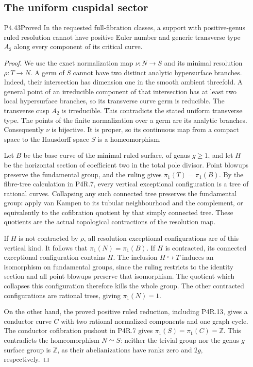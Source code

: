 \subsection{The uniform cuspidal sector}

\begin{statement}{P4.43}{Proved}
In the requested full-fibration classes, a support with
positive-genus ruled resolution cannot have positive
Euler number and generic transverse type $A_2$ along
every component of its critical curve.
\end{statement}
\begin{proof}
We use the exact normalization map
$\nu:N\longrightarrow S$ and its minimal resolution
$\rho:T\longrightarrow N$. A germ of $S$ cannot have
two distinct analytic hypersurface branches. Indeed,
their intersection has dimension one in the smooth
ambient threefold. A general point of an irreducible
component of that intersection has at least two local
hypersurface branches, so its transverse curve germ is
reducible. The transverse cusp $A_2$ is irreducible.
This contradicts the stated uniform transverse type.
The points of the finite normalization over a germ are
its analytic branches. Consequently $\nu$ is bijective.
It is proper, so its continuous map from a compact space
to the Hausdorff space $S$ is a homeomorphism.

Let $B$ be the base curve of the minimal ruled surface,
of genus $g\ge1$, and let $H$ be the horizontal section
of coefficient two in the total pole divisor. Point
blowups preserve the fundamental group, and the ruling
gives $\pi_1(T)=\pi_1(B)$. By the fibre-tree calculation
in P4R.7, every vertical exceptional configuration is a
tree of rational curves. Collapsing any such connected
tree preserves the fundamental group: apply van Kampen
to its tubular neighbourhood and the complement, or
equivalently to the cofibration quotient by that
simply connected tree. These quotients are the actual
topological contractions of the resolution map.

If $H$ is not contracted by $\rho$, all resolution
exceptional configurations are of this vertical kind.
It follows that $\pi_1(N)=\pi_1(B)$. If $H$ is
contracted, its connected exceptional configuration
contains $H$. The inclusion $H\hookrightarrow T$
induces an isomorphism on fundamental groups, since
the ruling restricts to the identity section and all
point blowups preserve that isomorphism. The quotient
which collapses this configuration therefore kills
the whole group. The other contracted configurations
are rational trees, giving $\pi_1(N)=1$.

On the other hand, the proved positive ruled reduction,
including P4R.13, gives a conductor curve $C$ with two
rational normalized components and one graph cycle.
The conductor cofibration pushout in P4R.7 gives
$\pi_1(S)=\pi_1(C)=\mathbb Z$. This contradicts the
homeomorphism $N\simeq S$: neither the trivial group
nor the genus-$g$ surface group is $\mathbb Z$, as their
abelianizations have ranks zero and $2g$, respectively.
\end{proof}
